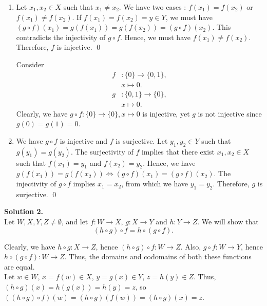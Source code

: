 \documentclass[10pt]{article}
\begin{document}
\begin{enumerate}
                \item Let $x_1, x_2 \in X$ such that $x_1 \neq x_2$. We have two cases : $f(x_1) = f(x_2)$ or $f(x_1) \neq f(x_2)$.
                If $f(x_1) = f(x_2) = y \in Y$, we must have $(g\circ f)(x_1) = g(f(x_1)) = g(f(x_2)) = (g\circ f)(x_2)$.
                This contradicts the injectivity of $g\circ f$. Hence, we must have $f(x_1) \neq f(x_2)$.
                Therefore, $f$ is injective. \qed

                Consider
                \begin{align*}
                        f &: \{0\}  \to \{0, 1\},\\
                        &x \mapsto 0.\\
                        g &: \{0, 1\} \to \{0\},\\
                        &x \mapsto 0.
                \end{align*}
                Clearly, we have $g\circ f: \{0\} \to \{0\}, x\mapsto 0$ is injective, yet $g$ is not injective since 
                $g(0) = g(1) = 0$.

                \item We have $g\circ f$ is injective and $f$ is surjective.
                Let $y_1, y_2 \in Y$ such that $g(y_1) = g(y_2)$. The surjectivity of $f$ implies that there exist $x_1, x_2 \in X$
                such that $f(x_1) = y_1$ and $f(x_2) = y_2$. Hence, we have $g(f(x_1)) = g(f(x_2)) \Leftrightarrow (g\circ f)(x_1) = (g\circ f)(x_2)$.
                The injectivity of $g\circ f$ implies $x_1 = x_2$, from which we have $y_1 = y_2$.
                Therefore, $g$ is surjective. \qed
        \end{enumerate}
        
        \textbf{Solution 2.}\\ 
        Let $W, X, Y, Z \neq \emptyset$, and let $f: W\to X$, $g: X\to Y$ and $h: Y\to Z$. We will show that $$(h\circ g)\circ f = h\circ (g\circ f).$$

        Clearly, we have $h\circ g: X \to Z$, hence $(h \circ g)\circ f: W \to Z$. Also, $g\circ f: W\to Y$, hence $h\circ (g\circ f): W \to Z$.
        Thus, the domains and codomains of both these functions are equal.\\

        Let $w \in W$, $x = f(w) \in X$, $y = g(x) \in Y$, $z = h(y) \in Z$. Thus, $(h\circ g)(x) = h(g(x)) = h(y) = z$, so 
        $((h\circ g)\circ f)(w) = (h\circ g)(f(w)) = (h\circ g)(x) = z$.
\end{document}
